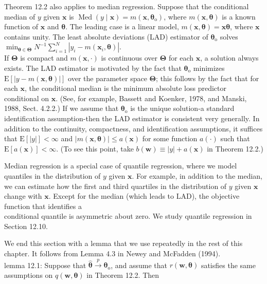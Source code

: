 \documentclass[10pt]{article}
\begin{document}
Theorem 12.2 also applies to median regression. Suppose that the conditional median of $y$ given $\mathbf{x}$ is $\operatorname{Med}(y \mid \mathbf{x})=m\left(\mathbf{x}, \boldsymbol{\theta}_{\mathrm{o}}\right)$, where $m(\mathbf{x}, \boldsymbol{\theta})$ is a known function of $\mathbf{x}$ and $\boldsymbol{\theta}$. The leading case is a linear model, $m(\mathbf{x}, \boldsymbol{\theta})=\mathbf{x} \boldsymbol{\theta}$, where $\mathbf{x}$ contains unity. The least absolute deviations (LAD) estimator of $\boldsymbol{\theta}_{\mathrm{o}}$ solves\\
$\min _{\boldsymbol{\theta} \in \boldsymbol{\Theta}} N^{-1} \sum_{i=1}^{N}\left|y_{i}-m\left(\mathbf{x}_{i}, \boldsymbol{\theta}\right)\right|$.\\
If $\boldsymbol{\Theta}$ is compact and $m(\mathbf{x}, \cdot)$ is continuous over $\boldsymbol{\Theta}$ for each $\mathbf{x}$, a solution always exists. The LAD estimator is motivated by the fact that $\boldsymbol{\theta}_{\mathrm{o}}$ minimizes $\mathrm{E}[|y-m(\mathbf{x}, \boldsymbol{\theta})|]$ over the parameter space $\boldsymbol{\Theta}$; this follows by the fact that for each $\mathbf{x}$, the conditional median is the minimum absolute loss predictor conditional on $\mathbf{x}$. (See, for example, Bassett and Koenker, 1978, and Manski, 1988, Sect. 4.2.2.) If we assume that $\boldsymbol{\theta}_{\mathrm{o}}$ is the unique solution-a standard identification assumption-then the LAD estimator is consistent very generally. In addition to the continuity, compactness, and identification assumptions, it suffices that $\mathrm{E}[|y|]<\infty$ and $|m(\mathbf{x}, \boldsymbol{\theta})| \leq a(\mathbf{x})$ for some function $a(\cdot)$ such that $\mathrm{E}[a(\mathbf{x})]<\infty$. (To see this point, take $b(\mathbf{w}) \equiv|y|+a(\mathbf{x})$ in Theorem 12.2.)

Median regression is a special case of quantile regression, where we model quantiles in the distribution of $y$ given $\mathbf{x}$. For example, in addition to the median, we can estimate how the first and third quartiles in the distribution of $y$ given $\mathbf{x}$ change with $\mathbf{x}$. Except for the median (which leads to LAD), the objective function that identifies a\\
conditional quantile is asymmetric about zero. We study quantile regression in Section 12.10.

We end this section with a lemma that we use repeatedly in the rest of this chapter. It follows from Lemma 4.3 in Newey and McFadden (1994).\\
lemma 12.1: Suppose that $\hat{\boldsymbol{\theta}} \xrightarrow{p} \boldsymbol{\theta}_{\mathrm{o}}$, and assume that $r(\mathbf{w}, \boldsymbol{\theta})$ satisfies the same assumptions on $q(\mathbf{w}, \boldsymbol{\theta})$ in Theorem 12.2. Then
\end{document}
